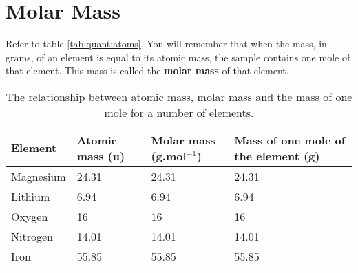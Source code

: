 



\section{Molar Mass}
\label{subsec:quant:mm}


Refer to table \ref{tab:quant:atoms}. You will remember that when the mass, in grams, of an element is equal to its atomic mass, the sample contains one mole of that element. This mass is called the \textbf{molar mass} of that element.

\begin{table}[h]
\begin{center}
\begin{tabular}{|m{2cm}|m{2.5cm}|m{2.2cm}|m{3cm}|}\hline
\textbf{Element} & \textbf{Atomic mass (u)} & \textbf{Molar mass (g.mol$^{-1}$)} & \textbf{Mass of one mole of the element (g)} \\\hline
Magnesium & 24.31 & 24.31 & 24.31 \\\hline
Lithium & 6.94 & 6.94 & 6.94 \\\hline
Oxygen & 16 & 16 & 16 \\\hline
Nitrogen & 14.01 & 14.01 & 14.01 \\\hline
Iron & 55.85 & 55.85 & 55.85 \\\hline
\end{tabular}
\caption{The relationship between atomic mass, molar mass and the mass of one mole for a number of elements.}
\label{tab:mole summary}
\end{center}
\end{table}


